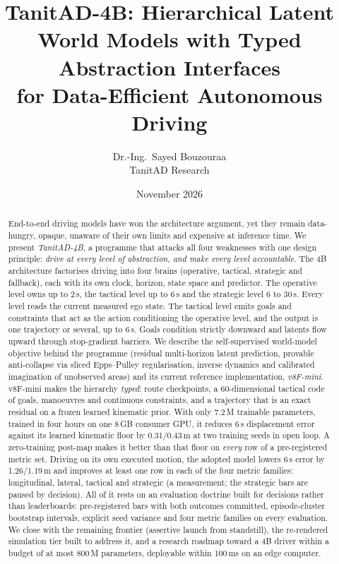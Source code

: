 \documentclass[10pt,twocolumn]{article}
\title{\vspace{-6mm}\textbf{TanitAD-4B: Hierarchical Latent World Models with Typed Abstraction Interfaces\\for Data-Efficient Autonomous Driving}}
\author{Dr.-Ing.\ Sayed Bouzouraa\\[1mm]\normalsize TanitAD Research}
\date{November 2026}
\theoremstyle{remark}
\begin{document}
\maketitle

\begin{abstract}
End-to-end driving models have won the architecture argument, yet they remain data-hungry, opaque, unaware of their own limits and
expensive at inference time. We present \emph{TanitAD-4B}, a programme that attacks all four weaknesses with one design principle:
\emph{drive at every level of abstraction, and make every level accountable}. The 4B architecture factorises driving into four
brains (operative, tactical, strategic and fallback), each with its own clock, horizon, state space and predictor. The operative
level owns up to 2\,s, the tactical level up to 6\,s and the strategic level 6 to 30\,s. Every level reads the current measured ego state.
The tactical level emits goals and constraints that act as the action conditioning the operative level, and the output is one
trajectory or several, up to 6\,s. Goals condition strictly downward and latents flow upward through stop-gradient barriers. We describe the self-supervised world-model objective
behind the programme (residual multi-horizon latent prediction, provable anti-collapse via sliced Epps--Pulley regularisation,
inverse dynamics and calibrated imagination of unobserved areas) and its current reference implementation, \emph{v8F-mini}.
v8F-mini makes the hierarchy \emph{typed}: route checkpoints, a 60-dimensional tactical code of goals, manoeuvres and continuous
constraints, and a trajectory that is an exact residual on a frozen learned kinematic prior. With only 7.2\,M trainable parameters,
trained in four hours on one 8\,GB consumer GPU, it reduces 6\,s displacement error against its learned kinematic floor by
0.31/0.43\,m at two training seeds in open loop. A zero-training post-map makes it better than that floor on \emph{every} row of a
pre-registered metric set. Driving on its own executed motion, the adopted model lowers 6\,s error by 1.26/1.19\,m and improves at
least one row in each of the four metric families: longitudinal, lateral, tactical and strategic (a measurement; the strategic bars are paused by decision). All of it rests on an evaluation
doctrine built for decisions rather than leaderboards: pre-registered bars with both outcomes committed, episode-cluster bootstrap
intervals, explicit seed variance and four metric families on every evaluation. We close with the remaining frontier (assertive
launch from standstill), the re-rendered simulation tier built to address it, and a research roadmap toward a 4B driver within a
budget of at most 800\,M parameters, deployable within 100\,ms on an edge computer.
\end{abstract}
\end{document}
